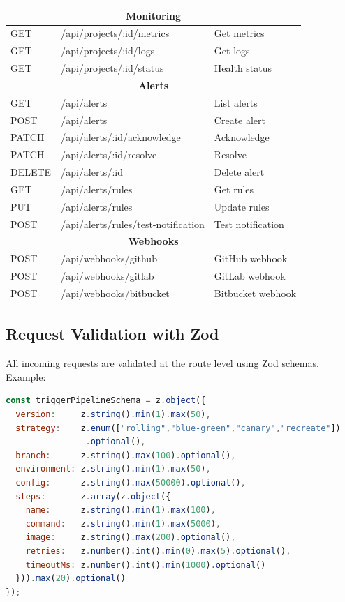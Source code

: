 \documentclass[12pt,a4paper,twoside]{report}
\begin{document}
\begin{longtable}{l|l|p{7cm}}
\multicolumn{3}{c}{\textbf{Monitoring}} \\
\midrule
GET & /api/projects/:id/metrics & Get metrics \\
GET & /api/projects/:id/logs & Get logs \\
GET & /api/projects/:id/status & Health status \\
\midrule

\multicolumn{3}{c}{\textbf{Alerts}} \\
\midrule
GET & /api/alerts & List alerts \\
POST & /api/alerts & Create alert \\
PATCH & /api/alerts/:id/acknowledge & Acknowledge \\
PATCH & /api/alerts/:id/resolve & Resolve \\
DELETE & /api/alerts/:id & Delete alert \\
GET & /api/alerts/rules & Get rules \\
PUT & /api/alerts/rules & Update rules \\
POST & /api/alerts/rules/test-notification & Test notification \\
\midrule

\multicolumn{3}{c}{\textbf{Webhooks}} \\
\midrule
POST & /api/webhooks/github & GitHub webhook \\
POST & /api/webhooks/gitlab & GitLab webhook \\
POST & /api/webhooks/bitbucket & Bitbucket webhook \\

\end{longtable}

\subsection{Request Validation with Zod}

All incoming requests are validated at the route level using Zod schemas. Example:

\begin{lstlisting}[language=JavaScript, caption={Zod Schema for Pipeline Trigger}]
const triggerPipelineSchema = z.object({
  version:     z.string().min(1).max(50),
  strategy:    z.enum(["rolling","blue-green","canary","recreate"])
                .optional(),
  branch:      z.string().max(100).optional(),
  environment: z.string().min(1).max(50),
  config:      z.string().max(50000).optional(),
  steps:       z.array(z.object({
    name:      z.string().min(1).max(100),
    command:   z.string().min(1).max(5000),
    image:     z.string().max(200).optional(),
    retries:   z.number().int().min(0).max(5).optional(),
    timeoutMs: z.number().int().min(1000).optional()
  })).max(20).optional()
});
\end{lstlisting}
\end{document}
